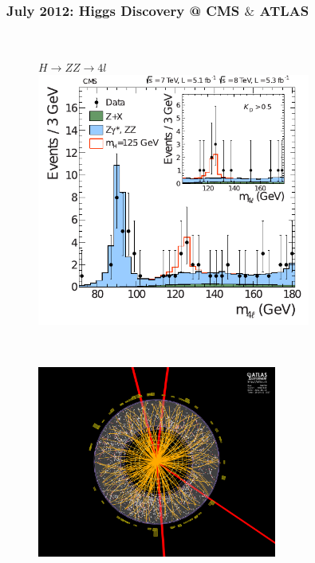 \documentclass[xcolor={usenames,dvipsnames,svgnames,table}]{beamer}
\begin{document}
\begin{frame}
    \frametitle{July 2012: Higgs Discovery @ CMS $\&$ ATLAS}
	\begin{columns}
		\begin{column}{0.49\textwidth}
	        \begin{figure}[t]
				\\
				\vspace{-0.5cm}
				\centering \textcolor{color1}{$H \rightarrow ZZ \rightarrow 4l$}\\
	            \includegraphics[width=0.8\textwidth]{plots/higgsZZ_discovery.pdf}
	        \end{figure}\\
			\vspace{-0.9cm}
			\begin{figure}[t]
				\includegraphics[width=0.7\textwidth]{plots/atlas_event_display.png}
	        \end{figure}

\end{column}
\end{columns}
\end{frame}
\end{document}
